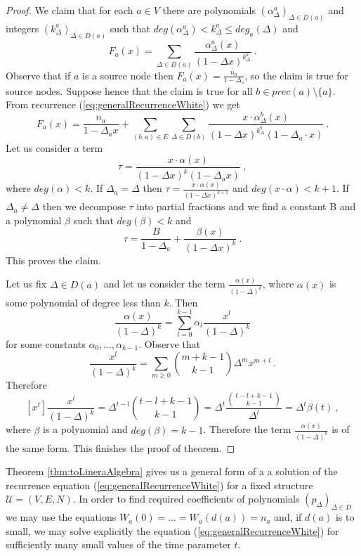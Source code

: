 \documentclass[submission]{dmtcs}
\begin{document}
\begin{proof}
We claim that for each $a\in V$ there
are polynomials $(\alpha^{a}_{\Delta})_{\Delta \in D(a)}$ and integers 
$(k^{a}_{\Delta})_{\Delta \in D(a)}$ such that 
$deg(\alpha^{a}_{\Delta}) < k^{a}_{\Delta} \leq deg_a(\Delta)$ and
$$
  F_a(x) = \sum_{\Delta\in D(a)} \frac{\alpha^{a}_{\Delta}(x)}{(1-\Delta x)^{k^{a}_{\Delta}}}~.
$$
Observe that if $a$ is a source node then $F_a(x) = \frac{n_a}{1-\Delta_s}$, 
so the claim is true for source nodes.
Suppose hence that the claim is true for all $b\in prec(a) \setminus \{a\}$.
From recurrence (\ref{eq:generalRecurrenceWhite}) we get
$$ 
F_a(x) = \frac{n_a}{1-\Delta_{a} x} +
         \sum_{(b,a)\in E}
				 \sum_{\Delta\in D(b)} \frac{x\cdot\alpha^{b}_{\Delta}(x)}{(1-\Delta x)^{k^{b}_{\Delta}}(1-\Delta_{a} \cdot x)}~.
$$
Let us consider a term
$$
\tau = \frac{x\cdot\alpha(x)}{(1-\Delta x)^{k}(1-\Delta_{a} x)} ~,
$$
where $deg(\alpha)<k$.
If $\Delta_a = \Delta$ then 
$\tau = \frac{x\cdot\alpha(x)}{(1-\Delta x)^{k+1}}$ and
$deg(x\cdot\alpha)< k+1$. If $\Delta_a \neq \Delta$ then we decompose 
$\tau$ into partial fractions and we find a constant B and a polynomial $\beta$ 
such that $deg(\beta)<k$ and
$$
  \tau = \frac{B}{1-\Delta_a} + \frac{\beta(x)}{(1-\Delta x)^{k}}~.
$$
This proves the claim.

Let us fix $\Delta \in D(a)$ and let us consider the term 
$\frac{\alpha(x)}{(1-\Delta)^k}$, where $\alpha(x)$ is some polynomial of degree
less than $k$. Then
$$
  \frac{\alpha(x)}{(1-\Delta)^k} = \sum_{l=0}^{k-1} \alpha_l\frac{x^l}{(1-\Delta)^k}
$$
for some constants $\alpha_0,\ldots,\alpha_{k-1}$.
Observe that
$$
  \frac{x^l}{(1-\Delta)^k} = 
	\sum_{m\geq 0} \binom{m+k-1}{k-1} \Delta^m x^{m+l}~.
$$
Therefore
$$
[x^t]\frac{x^l}{(1-\Delta)^k} =  \Delta^{t-l} \binom{t-l+k-1}{k-1} =
\Delta^{t} \frac{\binom{t-l+k-1}{k-1}}{\Delta^l} =
\Delta^{t} \beta(t)~,
$$
where $\beta$ is a polynomial and $deg(\beta) = k-1$.
Therefore the term $\frac{\alpha(x)}{(1-\Delta)^k}$ is of the same form.
This finishes the proof of theorem.
\end{proof}

Theorem \ref{thm:toLineraAlgebra} gives us a general form of a a solution
of the recurrence equation (\ref{eq:generalRecurrenceWhite}) for a fixed structure
$\mathcal{U} = (V,E,N)$. In order to find required coefficients 
of polynomials $(p_\Delta)_{\Delta\in D}$
we may use the equations 
$W_a(0) = \ldots = W_a(d(a)) = n_a$ and, if $d(a)$ is to small, 
we may solve explicitly the equation (\ref{eq:generalRecurrenceWhite}) for
sufficiently many small values of the time parameter $t$.
\end{document}
